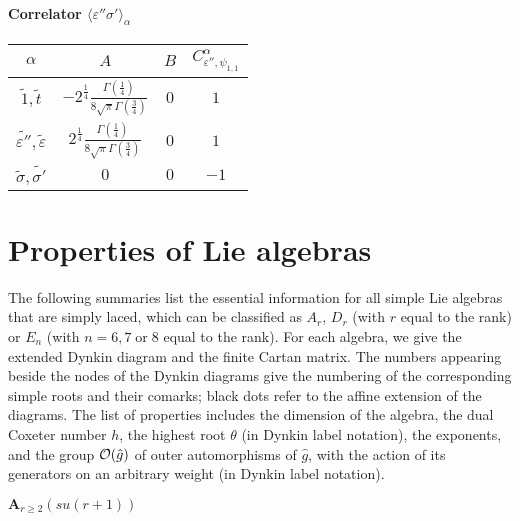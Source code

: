 \documentclass[a4paper,12pt]{report}
\begin{document}
\subsubsection{Correlator $\langle \varepsilon''\sigma'\rangle_{\alpha}$}
\begin{center}
\begin{tabular}{|c|c|c|c|}\hline
$\alpha$ &  $A$  & $B$ & $ C_{\varepsilon'',\psi_{1,1}}^{\alpha}$  \\
\hline

$\tilde{1}, \tilde{t}$ & $-2^{\frac{1}{4}}\frac{\Gamma \left(\frac{1}{4} \right)}{8\sqrt{\pi }\Gamma \left(\frac{3}{4} \right)}$ & $0$ & $1$ \\

$\tilde{\varepsilon''}, \tilde{\varepsilon}$  & $2^{\frac{1}{4}}\frac{\Gamma \left(\frac{1}{4} \right)}{8\sqrt{\pi }\Gamma \left(\frac{3}{4} \right)}$ & $0$ & $1$ \\


$\tilde{\sigma}, \tilde{\sigma'}$  & $0$ & $0$ & $-1$ \\ \hline
\end{tabular}
\end{center}








\chapter{Properties of Lie algebras}
\label{Liealg}

The following summaries list the essential information for all simple Lie algebras that are simply laced, which
can be classified as $A_{r}$, $D_{r}$ (with $r$ equal to the rank) or $E_{n}$  (with $n=6,7\;\textrm{or}\;8$ equal
to the rank). For each algebra, we give the extended Dynkin diagram and the finite Cartan matrix. The numbers
appearing beside the nodes of the Dynkin diagrams give the numbering of the corresponding simple roots and their
comarks; black dots refer to the affine extension of the diagrams. The list of properties includes the dimension
of the algebra, the dual Coxeter number $h$, the highest root $\theta$ (in Dynkin label notation), the exponents,
and the group ${\cal O}(\hat{g})$ of outer automorphisms of $\hat{g}$, with the action of its generators on an
arbitrary weight (in Dynkin label notation).


\vspace{2cm}

\begin{flushleft}
$\textbf{A}_{r\geq 2}(su(r+1))$
\end{flushleft}
\end{document}
